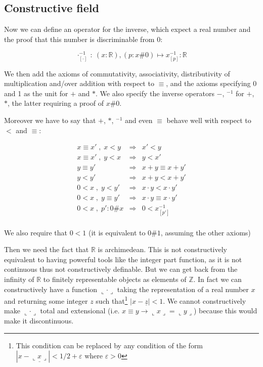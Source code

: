 \documentclass[a4paper,11pt]{article}
\newcommand{\R}{\mathbb{R}}
\newcommand{\Z}{\mathbb{Z}}
\theoremstyle{definition}
\theoremstyle{remark}
\begin{document}
\subsection{Constructive field}

  Now we can define an operator for the inverse, which expect a real number and the
  proof that this number is discriminable from 0:

  \[
    \cdot^{-1}_{[\cdot]} \ : \  (x:\R), (p:x\#0) \mapsto x^{-1}_{[p]} : \R
  \]

  We then add the axioms of commutativity, associativity, distributivity of multiplication and/over
  addition with respect to $≡$, and the axioms specifying 0 and 1 as the unit for $+$ and $*$. We also specify the inverse operators $-$, $^{-1}$ for $+$, $*$, the latter requiring a proof of $x\#0$.

  Moreover we have to say that $+$, $*$, $^{-1}$ and even $≡$ behave well with respect to $<$ and $≡$:

  \[
    \begin{array}{rcl}
      x ≡ x' \;,\; x < y   &  \Rightarrow  & x' < y \\
      x ≡ x' \;,\; y < x   &  \Rightarrow  & y < x' \\
      y ≡ y'               &  \Rightarrow  & x + y ≡ x + y' \\
      y < y'                    &  \Rightarrow  & x + y < x + y' \\
      0 < x \;,\; y < y'        &  \Rightarrow  & x \cdot y < x \cdot y' \\
      0 < x \;,\; y ≡ y'   &  \Rightarrow  & x \cdot y ≡ x \cdot y' \\
      0<x \;,\;  p':0\#x      &  \Rightarrow  & 0 < x^{-1}_{[p']} \\
    \end{array}
  \]

  We also require that $0<1$ (it is equivalent to $0\#1$, assuming the other axioms)

  Then we need the fact that $\R$ is archimedean. This is not constructively equivalent to having powerful tools like the integer part function, as it is not continuous thus not constructively definable. But we can get back from the infinity of $\R$ to finitely representable objects as elements of $\Z$. In fact we can constructively have a function $\llcorner \cdot \lrcorner$ taking the representation of a real number $x$ and returning some integer $z$ such that\footnote{This condition can be replaced by any condition of the form $| x-\underline {\llcorner x \lrcorner} | < 1/2+\varepsilon$ where $\varepsilon>0$} $| x-\underline z | < 1$. We cannot constructively make $\llcorner \cdot \lrcorner$ total and extensional (i.e. $x≡y → \llcorner x \lrcorner=\llcorner y \lrcorner$) because this would make it discontinuous.
\end{document}
